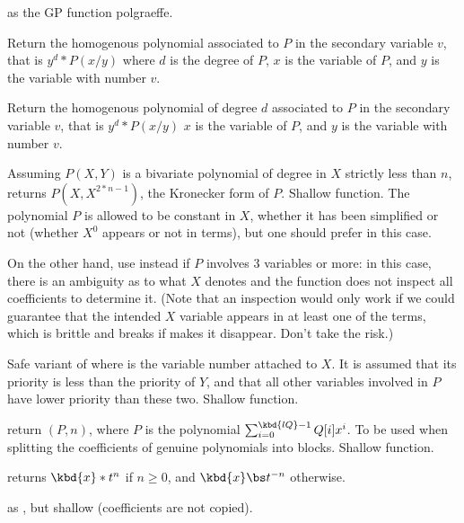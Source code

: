  as the GP function polgraeffe.

 Return the homogenous polynomial
associated to $P$ in the secondary variable $v$, that is $y^d*P(x/y)$ where $d$
is the degree of $P$, $x$ is the variable of $P$, and  $y$ is the variable with
number $v$.

 Return the homogenous
polynomial of degree $d$ associated to $P$ in the secondary variable $v$, that
is $y^d*P(x/y)$ $x$ is the variable of $P$, and  $y$ is the variable with
number $v$.

 Assuming $P(X,Y)$ is a bivariate
polynomial of degree in $X$ strictly less than $n$, returns $P(X,X^{2*n-1})$,
the Kronecker form of $P$. Shallow function.
The polynomial $P$ is allowed to be constant in $X$, whether it has been
simplified or not (whether $X^0$ appears or not in terms), but one should
prefer  in this case.

On the other hand, use  instead if $P$ involves
3 variables or more: in this case, there is an ambiguity as to what $X$
denotes and the function does not inspect all coefficients to determine it.
(Note that an inspection would only work if we could guarantee that the
intended $X$ variable appears in at least one of the terms, which is brittle
and breaks if  makes it disappear. Don't take the risk.)

 Safe variant
of  where  is the variable number
attached to $X$. It is assumed that its priority is less than the priority of
$Y$, and that all other variables involved in $P$ have lower priority than
these two. Shallow function.

 return
$(P, n)$, where $P$ is the polynomial
$\sum_{i = 0}^{\kbd{lQ} - 1} Q[i] x^i$. To be used when splitting
the coefficients of genuine polynomials into blocks. Shallow function.



 returns $\kbd{x} * t^n$ if $n\geq 0$,
and $\kbd{x} \bs t^{-n}$ otherwise.

 as , but
shallow (coefficients are not copied).

